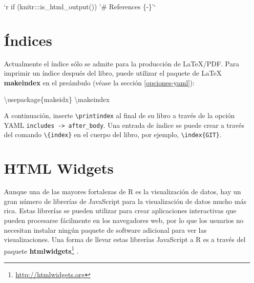 \documentclass[12pt,]{krantz}
\makeatletter
\newenvironment{Shaded}{\begin{snugshade}}{\end{snugshade}}
\newcommand{\BaseNTok}[1]{\textcolor[rgb]{0.00,0.00,0.81}{{#1}}}
\newcommand{\NormalTok}[1]{{#1}}
\renewcommand{\href}[2]{#2\footnote{\url{#1}}}
\newenvironment{kframe}{%
\medskip{}
\setlength{\fboxsep}{.8em}
 \def\at@end@of@kframe{}%
 \ifinner\ifhmode%
  \def\at@end@of@kframe{\end{minipage}}%
  \begin{minipage}{\columnwidth}%
 \fi\fi%
 \def\FrameCommand##1{\hskip\@totalleftmargin \hskip-\fboxsep
 \colorbox{shadecolor}{##1}\hskip-\fboxsep
     \hskip-\linewidth \hskip-\@totalleftmargin \hskip\columnwidth}%
 \MakeFramed {\advance\hsize-\width
   \@totalleftmargin\z@ \linewidth\hsize
   \@setminipage}}%
 {\par\unskip\endMakeFramed%
 \at@end@of@kframe}
\renewenvironment{Shaded}{\begin{kframe}}{\end{kframe}}
\theoremstyle{definition}
\theoremstyle{definition}
\theoremstyle{remark}
\makeatother
\begin{document}
\begin{Shaded}
\begin{Highlighting}[]
\BaseNTok{`r if (knitr:::is_html_output()) '# References \{-\}'`}
\end{Highlighting}
\end{Shaded}

\section{Índices}\label{latex-index}

Actualmente el índice  sólo se admite para la producción de
LaTeX/PDF. Para imprimir un índice después del libro, puede utilizar el
paquete de LaTeX \textbf{makeindex} en el preámbulo (véase la sección
\ref{opciones-yaml}):

\begin{Shaded}
\begin{Highlighting}[]
\NormalTok{\textbackslash{}usepackage\{makeidx\}}
\NormalTok{\textbackslash{}makeindex}
\end{Highlighting}
\end{Shaded}

A continuación, inserte \texttt{\textbackslash{}printindex} al final de
su libro a través de la opción YAML
\texttt{includes\ -\textgreater{}\ after\_body}. Una entrada de índice
se puede crear a través del comando \texttt{\textbackslash{}\{index\}}
en el cuerpo del libro, por ejemplo,
\texttt{\textbackslash{}index\{GIT\}}.

\section{HTML Widgets}\label{html-widgets}

Aunque una de las mayores fortalezas de R es la visualización de datos,
hay un gran número de librerías de JavaScript para la visualización de
datos mucho más rica. Estas librerías se pueden utilizar para crear
aplicaciones interactivas que pueden procesarse fácilmente en los
navegadores web, por lo que los usuarios no necesitan instalar ningún
paquete de software adicional para ver las visualizaciones. Una forma de
llevar estas librerías JavaScript a R es a través del paquete
\href{http://htmlwidgets.org}{\textbf{htmlwidgets}}
\citep{R-htmlwidgets}.
\end{document}
